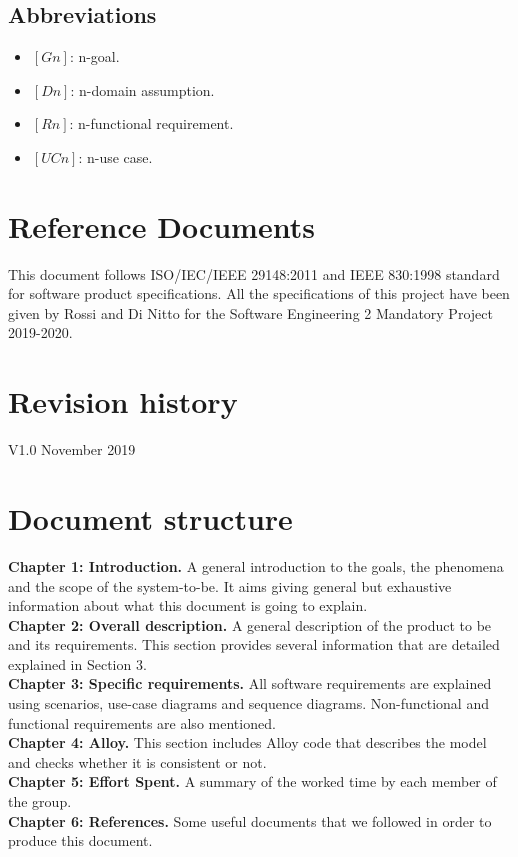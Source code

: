 \documentclass[../RASD.tex]{subfiles}
\begin{document}
    \subsection{Abbreviations}\label{subsec:abbreviations}
    \begin{itemize}
        \item $[Gn]$: n-goal.
        \item $[Dn]$: n-domain assumption.
        \item $[Rn]$: n-functional requirement.
        \item $[UCn]$: n-use case.
    \end{itemize}

    \section{Reference Documents}\label{sec:reference-documents}
    This document follows ISO/IEC/IEEE 29148:2011 and IEEE 830:1998 standard for software product specifications.
    All the specifications of this project have been given by Rossi and Di Nitto for the Software Engineering 2 Mandatory Project 2019-2020.

    \section{Revision history}\label{sec:revision-history}
    V1.0 November  2019

    \section{Document structure}\label{sec:document-structure}
    \textbf{Chapter 1: Introduction.} A general introduction to the goals, the phenomena and the scope of the system-to-be.
    It aims giving general but exhaustive information about what this document is going to explain.
    \\
    \textbf{Chapter 2: Overall description.} A general description of the product to be and its requirements.
    This section provides several information that are detailed explained in Section 3.
    \\
    \textbf{Chapter 3: Specific requirements.} All software requirements are explained using scenarios, use-case diagrams and sequence diagrams.
    Non-functional and functional requirements are also mentioned.
    \\
    \textbf{Chapter 4: Alloy.} This section includes Alloy code that describes the model and checks whether it is consistent or not.
    \\
    \textbf{Chapter 5: Effort Spent.} A summary of the worked time by each member of the group.
    \\
    \textbf{Chapter 6: References.} Some useful documents that we followed in order to produce this document.
\end{document}
